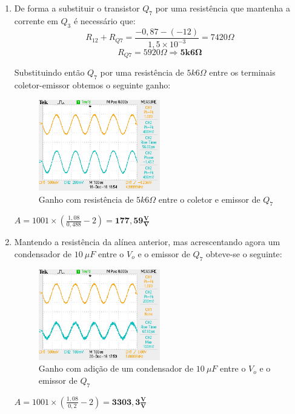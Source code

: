 \documentclass[a4paper]{article}
\begin{document}
            \begin{enumerate}
                \item De forma a substituir o transistor $Q_7$ por uma resistência que mantenha a corrente em $Q_3$ é necessário que:
                $$R_{12} + R_{Q7} = \frac{-0,87-(-12)}{1,5\times10^{-3}} = 7420\Omega$$ 
                $$R_{Q7} = 5920\Omega \Rightarrow \bm{5k6\Omega}$$
                
                Substituindo então $Q_7$ por uma resistência de $5k6\Omega$ entre os terminais coletor-emissor obtemos o seguinte ganho:
                \begin{figure}[H]
                    \centering
                    \includegraphics[width=0.5\textwidth]{figura5_ganhoResistencia.JPG}
                    \caption{\label{fig:ganhoComResistencia}Ganho com resistência de $5k6\Omega$ entre o coletor e emissor de $Q_7$}
                \end{figure}
                \centerline{$A = 1001\times(\frac{1,08}{0,488} - 2) = \bm{177,59\frac{V}{V}}$}
                \bigskip
                
                \item Mantendo a resistência da alínea anterior, mas acrescentando agora um condensador de $10\ \mu F$ entre o $V_o$ e o emissor de $Q_7$ obteve-se o seguinte:
                \begin{figure}[H]
                    \centering
                    \includegraphics[width=0.5\textwidth]{figura6_ganhoCondensador.JPG}
                    \caption{\label{fig:ganhoComCondensador}Ganho com adição de um condensador de $10\ \mu F$ entre o $V_o$ e o emissor de $Q_7$}
                \end{figure}
                \centerline{$A = 1001\times(\frac{1,08}{0,2} - 2) = \bm{3303,3\frac{V}{V}}$}
                \bigskip
                

\end{enumerate}
\end{document}
